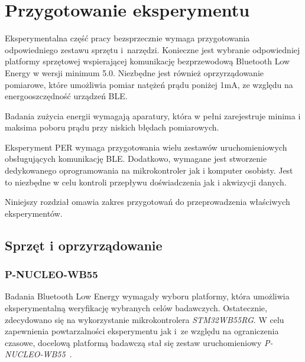 \section{Przygotowanie eksperymentu}

Eksperymentalna część pracy bezsprzecznie wymaga przygotowania odpowiedniego zestawu
sprzętu i~narzędzi. Konieczne jest wybranie odpowiedniej platformy sprzętowej
wspierającej komunikację bezprzewodową Bluetooth Low Energy w wersji minimum 5.0.
Niezbędne jest również oprzyrządowanie pomiarowe, które umożliwia pomiar natężeń
prądu poniżej 1mA, ze względu na energooszczędność urządzeń BLE.


Badania zużycia energii wymagają aparatury, która w pełni zarejestruje minima i maksima
poboru prądu przy niskich błędach pomiarowych.

Eksperyment PER wymaga przygotowania wielu zestawów uruchomieniowych obsługujących
komunikację BLE. Dodatkowo, wymagane jest stworzenie dedykowanego oprogramowania
na mikrokontroler jak i komputer osobisty. Jest to niezbędne w celu kontroli przepływu
doświadczenia jak i akwizycji danych.

Niniejszy rozdział omawia zakres przygotowań do przeprowadzenia właściwych eksperymentów.


\subsection{Sprzęt i oprzyrządowanie}

\subsubsection{P-NUCLEO-WB55}

Badania Bluetooth Low Energy wymagały wyboru platformy, która umożliwia eksperymentalną 
weryfikację wybranych celów badawczych. Ostatecznie, zdecydowano się na wykorzystanie 
mikrokontrolera {\it STM32WB55RG}. W celu zapewnienia powtarzalności eksperymentu jak 
i~ze względu na ograniczenia czasowe, docelową platformą badawczą stał się zestaw 
uruchomieniowy {\it P-NUCLEO-WB55}~\cite{noauthor_p-nucleo-wb55_nodate}.

